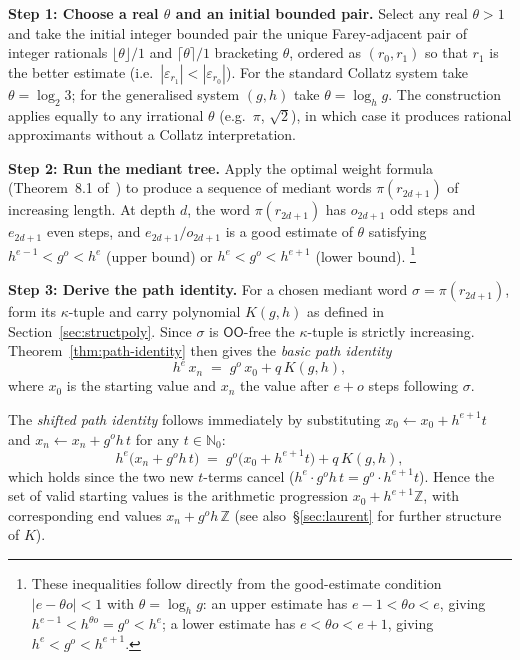 \documentclass[12pt]{article}
\theoremstyle{definition}
\theoremstyle{remark}
\theoremstyle{plain}
\newcommand{\OO}{\mathsf{O}}
\begin{document}
\medskip
\noindent\textbf{Step 1: Choose a real $\theta$ and an initial bounded pair.}
Select any real $\theta > 1$ and take the initial integer bounded pair
the unique Farey-adjacent pair of integer rationals $\lfloor\theta\rfloor/1$ and
$\lceil\theta\rceil/1$ bracketing $\theta$, ordered as $(r_0, r_1)$ so that $r_1$
is the better estimate (i.e.\ $|\varepsilon_{r_1}| < |\varepsilon_{r_0}|$).
For the standard Collatz system take $\theta = \log_2 3$; for the generalised
system $(g, h)$ take $\theta = \log_h g$.
The construction applies equally to any irrational $\theta$ (e.g.\ $\pi$,
$\sqrt{2}$), in which case it produces rational approximants without a Collatz
interpretation.

\medskip
\noindent\textbf{Step 2: Run the mediant tree.}
Apply the optimal weight formula (Theorem~8.1 of~\cite{paper76}) to produce a
sequence of mediant words $\pi(r_{2d+1})$ of increasing length.
At depth $d$, the word $\pi(r_{2d+1})$ has $o_{2d+1}$ odd steps and $e_{2d+1}$
even steps, and $e_{2d+1}/o_{2d+1}$ is a good estimate of $\theta$ satisfying
$h^{e-1} < g^o < h^e$ (upper bound) or $h^e < g^o < h^{e+1}$ (lower bound).%
\footnote{These inequalities follow directly from the good-estimate condition
$|e - \theta o| < 1$ with $\theta = \log_h g$: an upper estimate has
$e - 1 < \theta o < e$, giving $h^{e-1} < h^{\theta o} = g^o < h^e$;
a lower estimate has $e < \theta o < e + 1$, giving $h^e < g^o < h^{e+1}$.}

\medskip
\noindent\textbf{Step 3: Derive the path identity.}
For a chosen mediant word $\sigma = \pi(r_{2d+1})$, form its $\kappa$-tuple and
carry polynomial $K(g,h)$ as defined in Section~\ref{sec:structpoly}.
Since $\sigma$ is $\OO\OO$-free the $\kappa$-tuple is strictly increasing.
Theorem~\ref{thm:path-identity} then gives the \emph{basic path identity}
\[
  h^e\,x_n \;=\; g^o\,x_0 + q\,K(g, h),
\]
where $x_0$ is the starting value and $x_n$ the value after $e+o$ steps following
$\sigma$.

The \emph{shifted path identity} follows immediately by substituting
$x_0 \leftarrow x_0 + h^{e+1}t$ and $x_n \leftarrow x_n + g^o h\,t$
for any $t \in \mathbb{N}_0$:
\[
  h^e\bigl(x_n + g^o h\,t\bigr)
  \;=\; g^o\bigl(x_0 + h^{e+1}t\bigr) + q\,K(g,h),
\]
which holds since the two new $t$-terms cancel ($h^e \cdot g^o h\,t = g^o \cdot h^{e+1} t$).
Hence the set of valid starting values is the arithmetic progression
$x_0 + h^{e+1}\mathbb{Z}$, with corresponding end values $x_n + g^o h\,\mathbb{Z}$
(see also~\S\ref{sec:laurent} for further structure of $K$).
\end{document}
